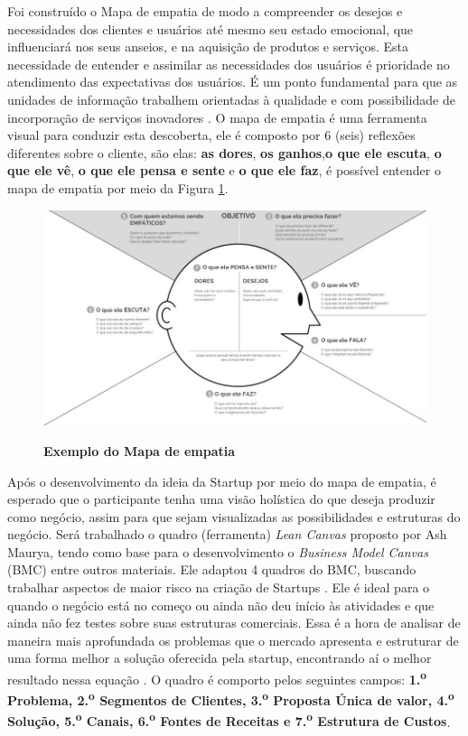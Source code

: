 Foi construído o Mapa de empatia de modo a compreender os desejos e necessidades dos clientes e usuários até mesmo seu estado emocional, que influenciará nos seus anseios, e na aquisição de produtos e serviços. Esta necessidade de entender e assimilar as necessidades dos usuários é prioridade no atendimento das expectativas dos usuários. É um ponto fundamental para que as unidades de informação trabalhem orientadas à qualidade e com possibilidade de incorporação de serviços inovadores \cite{valdrich_mapa_2018}. O mapa de empatia é uma ferramenta visual para conduzir esta descoberta, ele é composto por 6 (seis) reflexões diferentes sobre o cliente, são elas: \textbf{as dores}, \textbf{os ganhos},\textbf{o que ele escuta}, \textbf{o que ele vê}, \textbf{o que ele pensa e sente} e \textbf{o que ele faz}, é possível entender o mapa de empatia por meio da Figura \ref{figura_6}.

\begin{figure}[H]
\centering
\caption{\textbf{Exemplo do Mapa de empatia}}
\includegraphics[scale=0.5]{Imagens/mapa_empatia.jpg}
\label{figura_6}
\end{figure}


Após o desenvolvimento da ideia da Startup por meio do mapa de empatia, é esperado que o participante tenha uma visão holística do que deseja produzir como negócio, assim para que sejam visualizadas as possibilidades e estruturas do negócio. Será trabalhado o quadro (ferramenta) \textit{Lean Canvas} proposto por Ash Maurya, tendo como base para o desenvolvimento o \textit{Business Model Canvas} (BMC) entre outros materiais. Ele adaptou 4 quadros do BMC, buscando trabalhar aspectos de maior risco na criação de Startups \cite{maurya_running_2012}. Ele é ideal para o quando o negócio está no começo ou ainda não deu início às atividades e que ainda não fez testes sobre suas estruturas comerciais. Essa é a hora de analisar de maneira mais aprofundada os problemas que o mercado apresenta e estruturar de uma forma melhor a solução oferecida pela startup, encontrando aí o melhor resultado nessa equação \cite{sebrae_aprenda_2019}. O quadro é comporto pelos seguintes campos: \textbf{1.\textsuperscript{o} Problema, 2.\textsuperscript{o} Segmentos de Clientes, 3.\textsuperscript{o} Proposta Única de valor, 4.\textsuperscript{o} Solução, 5.\textsuperscript{o} Canais, 6.\textsuperscript{o} Fontes de Receitas e 7.\textsuperscript{o} Estrutura de Custos}.

